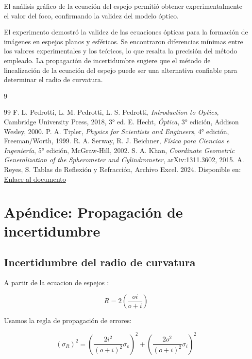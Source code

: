 \documentclass[article,12pt]{elsarticle}
\begin{document}
El análisis gráfico de la ecuación del espejo permitió obtener experimentalmente el valor del foco, confirmando la validez del modelo óptico.

El experimento demostró la validez de las ecuaciones ópticas para la formación de imágenes en espejos planos y esféricos. Se encontraron diferencias mínimas entre los valores experimentales y los teóricos, lo que resalta la precisión del método empleado. La propagación de incertidumbre sugiere que el método de linealización de la ecuación del espejo puede ser una alternativa confiable para determinar el radio de curvatura.
 



\begin{thebibliography}{9}

\begin{thebibliography}{99}
     F. L. Pedrotti, L. M. Pedrotti, L. S. Pedrotti, \textit{Introduction to Optics}, Cambridge University Press, 2018, 3° ed.
     E. Hecht, \textit{Óptica}, 3° edición, Addison Wesley, 2000.
     P. A. Tipler, \textit{Physics for Scientists and Engineers}, 4° edición, Freeman/Worth, 1999.
     R. A. Serway, R. J. Beichner, \textit{Física para Ciencias e Ingeniería}, 5° edición, McGraw-Hill, 2002.
     S. A. Khan, \textit{Coordinate Geometric Generalization of the Spherometer and Cylindrometer}, arXiv:1311.3602, 2015.
     A. Reyes, S. Tablas de Reflexión y Refracción, Archivo Excel. 2024. Disponible en: \href{https://docs.google.com/spreadsheets/d/14DnqcfldTRxWjrozeFOlHG4xXEaZAA9k/edit?usp=sharing\&ouid=112625838925660900694\&rtpof=true\&sd=true}{Enlace al documento}
\end{thebibliography}

\end{thebibliography}


\section*{Apéndice: Propagación de incertidumbre}

\subsection*{Incertidumbre del radio de curvatura}
A partir de la ecuacion de espejos :

\begin{mdframed}
\begin{equation}
    R = 2\left(\frac{o i}{o + i}\right)
\end{equation}
\end{mdframed}
Usamos la regla de propagación de errores:
\begin{mdframed}
\begin{equation}
    (\sigma_R)^2 = \left( \frac{2i^2}{(o + i)^2} \sigma_o \right)^2 + \left( \frac{2o^2}{(o + i)^2} \sigma_i \right)^2
\end{equation}
\end{mdframed}
\end{document}
